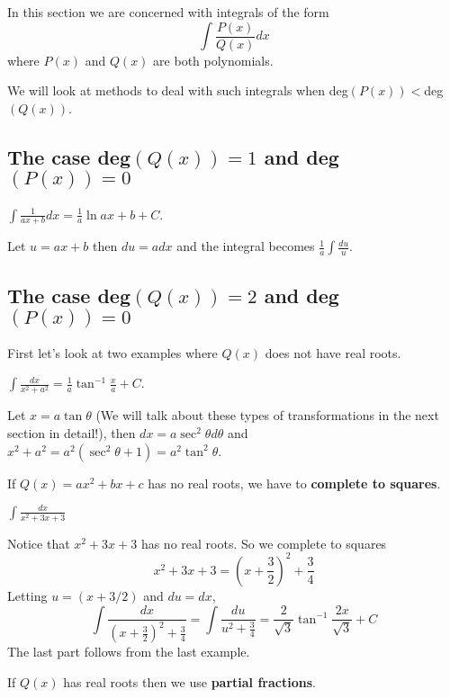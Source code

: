 \documentclass[../calc1-main.tex]{subfiles}
\begin{document}
In this section we are concerned with integrals of the form
\[
	\int \frac{P(x)}{Q(x)} dx
\]
where $P(x)$ and $Q(x)$ are both polynomials.

We will look at methods to deal with such integrals when deg$(P(x)) <$deg$(Q(x))$.

\subsection*{The case deg$(Q(x)) = 1$ and deg$(P(x)) = 0$}
\begin{example}
	$\displaystyle \int \frac{1}{ax + b} dx = \frac{1}{a} \ln{ax+b} + C$.
\end{example}
\begin{solution}
	Let $u= ax+b$ then $du = adx$ and the integral becomes $\frac{1}{a}\int \frac{du}{u}$.
\end{solution}

\subsection*{The case deg$(Q(x)) = 2$ and deg$(P(x)) = 0$}
First let's look at two examples where $Q(x)$ does not have real roots.
\begin{example}
	$\displaystyle \int \frac{dx}{x^2+a^2} = \frac{1}{a} \tan^{-1} \frac{x}{a} + C$.
\end{example}
\begin{solution}
	Let $x=a\tan \theta$ (We will talk about these types of transformations in the next section in detail!), then $dx = a \sec^2 \theta d\theta$ and $x^2+a^2 = a^2(\sec^2\theta + 1) = a^2 \tan^2 \theta$.
\end{solution}

If $Q(x) = a x^2 + bx + c$ has no real roots, we have to \textbf{complete to squares}.
\begin{example}
	$ \displaystyle \int \frac{dx}{x^2 + 3x + 3}$
\end{example}
\begin{solution}
	Notice that $x^2 + 3x + 3$ has no real roots. So we complete to squares
	\[
		x^2 + 3x + 3 = (x + \frac{3}{2})^2 + \frac{3}{4}
	\]
	Letting $u = (x+3/2)$ and $du = dx$,
	\[
		\int \frac{dx}{(x + \frac{3}{2})^2 + \frac{3}{4}} =
		\int \frac{du}{u^2 + \frac{3}{4}} = \frac{2}{\sqrt{3}} \tan^{-1} \frac{2x}{\sqrt{3}}  + C
	\]
	The last part follows from the last example.
\end{solution}

If $Q(x)$ has real roots then we use \textbf{partial fractions}.
\end{document}
